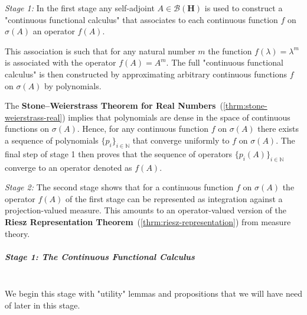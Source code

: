 \textit{Stage 1:} In the first stage any self-adjoint $A \in \mathcal{B}(\mathbf{H})$ is used to construct a "continuous functional calculus" that associates to each continuous function $f$ on $\sigma(A)$ an operator $f(A)$.

This association is such that for any natural number $m$ the function $f(\lambda) = \lambda^m$ is associated with the operator $f(A)=A^m$. The full "continuous functional calculus" is then constructed by approximating arbitrary continuous functions $f$ on $\sigma(A)$ by polynomials.

The \textbf{Stone–Weierstrass Theorem for Real Numbers}~(\ref{thrm:stone-weierstrass-real}) implies that polynomials are dense in the space of continuous functions on $\sigma(A)$. Hence, for any continuous function $f$ on $\sigma(A)$ there exists a sequence of polynomials $\{p_i\}_{i \in \mathbb{N}}$ that converge uniformly to $f$ on $\sigma(A)$. The final step of stage 1 then proves that the sequence of operators $\{p_i(A)\}_{i \in \mathbb{N}}$ converge to an operator denoted as $f(A)$.

\textit{Stage 2:} The second stage shows that for a continuous function $f$ on $\sigma(A)$ the operator $f(A)$ of the first stage can be represented as integration against a projection-valued measure. This amounts to an operator-valued version of the \textbf{Riesz Representation Theorem}~(\ref{thrm:riesz-representation}) from measure theory.

\subparagraph{Stage 1: The Continuous Functional Calculus}\mbox{}\\
We begin this stage with "utility" lemmas and propositions that we will have need of later in this stage.

